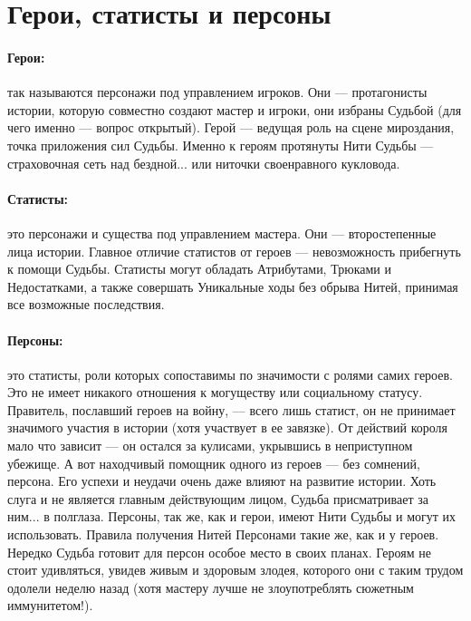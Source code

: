 \section{Герои, статисты и персоны}
\paragraph{Герои:} так называются персонажи под управлением игроков. Они — протагонисты истории, которую совместно создают мастер и игроки, они избраны Судьбой (для чего именно — вопрос открытый). Герой — ведущая роль на сцене мироздания, точка приложения сил Судьбы. Именно к героям протянуты Нити Судьбы — страховочная сеть над бездной... или ниточки своенравного кукловода.
\paragraph{Статисты:} это персонажи и существа под управлением мастера. Они — второстепенные лица истории. Главное отличие статистов от героев — невозможность прибегнуть к помощи Судьбы. Статисты могут обладать Атрибутами, Трюками и Недостатками, а также совершать Уникальные ходы без обрыва Нитей, принимая все возможные последствия.
\paragraph{Персоны:} это статисты, роли которых сопоставимы по значимости с ролями самих героев. Это не имеет никакого отношения к могуществу или социальному статусу. Правитель, пославший героев на войну, — всего лишь статист, он не принимает значимого участия в истории (хотя участвует в ее завязке). От действий короля мало что зависит — он остался за кулисами, укрывшись в неприступном убежище. А вот находчивый помощник одного из героев — без сомнений, персона. Его успехи и неудачи очень даже влияют на развитие истории. Хоть слуга и не является главным действующим лицом, Судьба присматривает за ним... в полглаза.
\newline Персоны, так же, как и герои, имеют Нити Судьбы и могут их использовать. Правила получения Нитей Персонами такие же, как и у героев.
\newline Нередко Судьба готовит для персон особое место в своих планах. Героям не стоит удивляться, увидев живым и здоровым злодея, которого они с таким трудом одолели неделю назад (хотя мастеру лучше не злоупотреблять сюжетным иммунитетом!).


